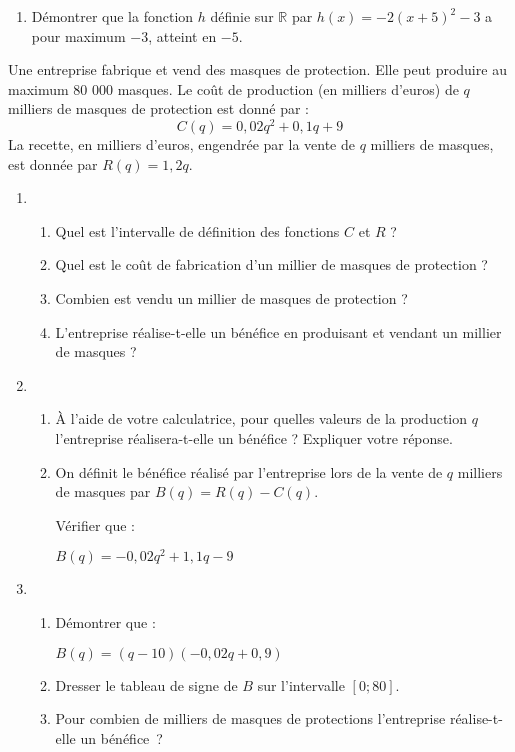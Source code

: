 \documentclass{exercice}
\begin{document}
\begin{multicols*}{2}
\begin{exo}
\begin{enumerate}
\item Démontrer que la fonction $h$ définie sur $\mathbb{R}$ par $h(x) = -2(x + 5)^2 - 3$ a pour maximum $-3$, atteint en $-5$. 
\end{enumerate}
\end{exo}

\begin{exo}
    
        Une entreprise fabrique et vend des masques de protection. Elle peut produire au maximum 80 000 masques. Le coût de production (en milliers d'euros) de $q$ milliers de masques de protection est donné par :
            \[ 
                C(q) = 0,02q^2 + 0,1q + 9
            \]
            La recette, en milliers d'euros, engendrée par la vente de $q$ milliers de masques, est donnée par $R(q) = 1,2q$. 
        \begin{enumerate}
        \item \begin{enumerate}
            \item Quel est l'intervalle de définition des fonctions $C$ et $R$ ?
            \item Quel est le coût de fabrication d'un millier de masques de protection ?
            \item Combien est vendu un millier de masques de protection ?
            \item L'entreprise réalise-t-elle un bénéfice en produisant et vendant un millier de masques ?
          \end{enumerate}
        \item \begin{enumerate}
          \item À l'aide de votre calculatrice,  pour quelles valeurs de la production $q$ l'entreprise réalisera-t-elle un bénéfice ? Expliquer votre réponse. 
          \item On définit le bénéfice réalisé par l'entreprise lors de la vente de $q$ milliers de masques par $B(q) = R(q) - C(q)$.

            \noindent 
            Vérifier que : \\
                 \centerline{$B(q) = -0,02q^2 + 1,1q - 9$}
          \end{enumerate}
            \item \begin{enumerate}[wide=0pt, label=\textbf{\alph*.}]
                \item Démontrer que : \\
                    \centerline{$B(q) = (q - 10)(-0,02q + 0,9)$}
                  \item Dresser le tableau de signe de $B$ sur l'intervalle $[0 ; 80]$.
                \item Pour combien de milliers de masques de protections l'entreprise réalise-t-elle un bénéfice~?
            \end{enumerate}


\end{enumerate}
\end{exo}
\end{multicols*}
\end{document}
